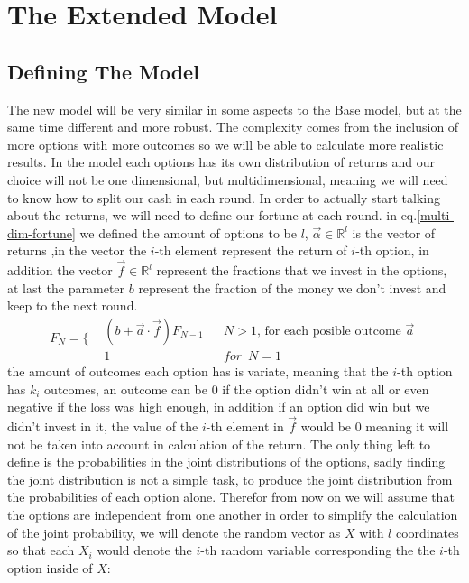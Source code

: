 \documentclass{article}
\begin{document}
	\section{The Extended Model}
	\subsection{Defining The Model}
	The new model will be very similar in some aspects to the Base model, but at the same time different and more robust. The complexity comes from the inclusion of more options with more outcomes so we will be able to calculate more realistic results. In the model each options has its own distribution of returns and our choice will not be one dimensional, but multidimensional, meaning we will need to know how to split our cash in each round.\newline
	In order to actually start talking about the returns, we will need to define our fortune at each round. in eq.\ref{multi-dim-fortune} we defined the amount of options to be $l$,  $\overrightarrow{\alpha} \in \mathbb{R}^l$ is the vector of returns ,in the vector the $i$-th element represent the return of $i$-th option, in addition the vector $\overrightarrow{f} \in \mathbb{R}^l$ represent the fractions that we invest in the options, at last the parameter $b$ represent the fraction of the money we don't invest and keep to the next round.\\
	\begin{equation}
	\label{multi-dim-fortune}
	F_N = \Bigg\{
	\begin{aligned}
		&(b + \overrightarrow{a}\cdot \overrightarrow{f})F_{N-1} &&N > 1 \text{, for each posible outcome }\overrightarrow{a}\\
		&1 &&for \enspace N=1
	\end{aligned}
	\end{equation}
	the amount of outcomes each option has is variate, meaning that the $i$-th option has $k_i$ outcomes, an outcome can be $0$ if the option didn't win at all or even negative if the loss was high enough,
	in addition if an option did win but we didn't invest in it, the value of the $i$-th element in $\overrightarrow{f}$ would be $0$ meaning it will not be taken into account in calculation of the return.
	\newline
	The only thing left to define is the probabilities in the joint distributions of the options,
	sadly finding the joint distribution is not a simple task, to produce the joint distribution from the probabilities of each option alone. Therefor from now on we will assume that the options are independent from one another in order to simplify the calculation of the joint probability, we will denote the random vector as $X$ with $l$ coordinates so that each $X_i$ would denote the $i$-th random variable corresponding the the $i$-th option inside of  $X$:
\end{document}
